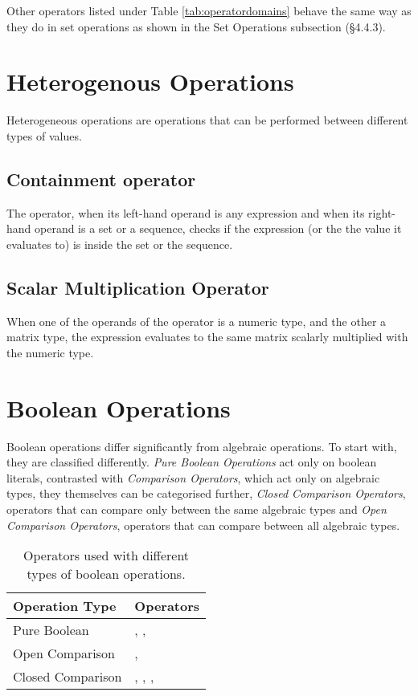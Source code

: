 \documentclass[11pt,a4paper]{book}
\begin{document}
Other operators listed under Table \ref{tab:operatordomains} behave the same way as they do in set operations as shown in the Set Operations subsection (\S 4.4.3).

\section{Heterogenous Operations}

Heterogeneous operations are operations that can be performed between different types of values.

\subsection{Containment operator }

The  operator, when its left-hand operand is any expression and when its right-hand operand is a set or a sequence, checks if the expression (or the the value it evaluates to) is inside the set or the sequence.

\subsection{Scalar Multiplication Operator \code{*}}

When one of the operands of the operator \code{*} is a numeric type, and the other a matrix type, the expression evaluates to the same matrix scalarly multiplied with the numeric type.

\section{Boolean Operations}

Boolean operations differ significantly from algebraic operations. To start with, they are classified differently. \textit{Pure Boolean Operations} act only on boolean literals, contrasted with \textit{Comparison Operators}, which act only on algebraic types, they themselves can be categorised further, \textit{Closed Comparison Operators}, operators that can compare only between the same algebraic types and \textit{Open Comparison Operators}, operators that can compare between all algebraic types.

\begin{table}[htbb]
\label{tab:booleanoperators}
\begin{tabular}{ll}
\toprule
Operation Type & Operators \\
\midrule
Pure Boolean & \code{\&}, \code{|}, \code{\textbackslash} \\
Open Comparison & \code{=}, \code{\textbackslash =} \\
Closed Comparison & \code{<}, \code{>}, \code{<=}, \code{>=} \\
\bottomrule
\end{tabular}
\caption{Operators used with different types of boolean operations.}
\end{table}
\end{document}
